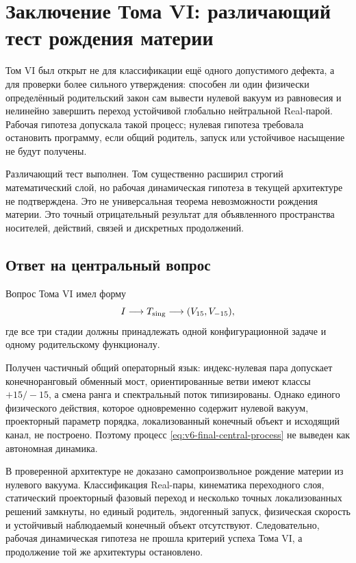 \chapter{Заключение Тома VI: различающий тест рождения материи}

Том VI был открыт не для классификации ещё одного допустимого дефекта, а
для проверки более сильного утверждения: способен ли один физически
определённый родительский закон сам вывести нулевой вакуум из равновесия и
нелинейно завершить переход устойчивой глобально нейтральной Real-парой.
Рабочая гипотеза допускала такой процесс; нулевая гипотеза требовала
остановить программу, если общий родитель, запуск или устойчивое
насыщение не будут получены.

Различающий тест выполнен. Том существенно расширил строгий
математический слой, но рабочая динамическая гипотеза в текущей
архитектуре не подтверждена. Это не универсальная теорема невозможности
рождения материи. Это точный отрицательный результат для объявленного
пространства носителей, действий, связей и дискретных продолжений.

\section{Ответ на центральный вопрос}

Вопрос Тома VI имел форму
\begin{equation}
 I\longrightarrow T_{\rm sing}
 \longrightarrow(V_{15},V_{-15}),
 \label{eq:v6-final-central-process}
\end{equation}
где все три стадии должны принадлежать одной конфигурационной задаче и
одному родительскому функционалу.

Получен частичный общий операторный язык: индекс-нулевая пара допускает
конечноранговый обменный мост, ориентированные ветви имеют классы
$+15/-15$, а смена ранга и спектральный поток типизированы. Однако
единого физического действия, которое одновременно содержит нулевой
вакуум, проекторный параметр порядка, локализованный конечный объект и
исходящий канал, не построено. Поэтому процесс
\eqref{eq:v6-final-central-process} не выведен как автономная динамика.

\begin{theorem}
В проверенной архитектуре не доказано самопроизвольное рождение материи
из нулевого вакуума. Классификация Real-пары, кинематика переходного слоя,
статический проекторный фазовый переход и несколько точных
локализованных решений замкнуты, но единый родитель, эндогенный запуск,
физическая скорость и устойчивый наблюдаемый конечный объект отсутствуют.
Следовательно, рабочая динамическая гипотеза не прошла критерий успеха
Тома VI, а продолжение той же архитектуры остановлено.
\end{theorem}

